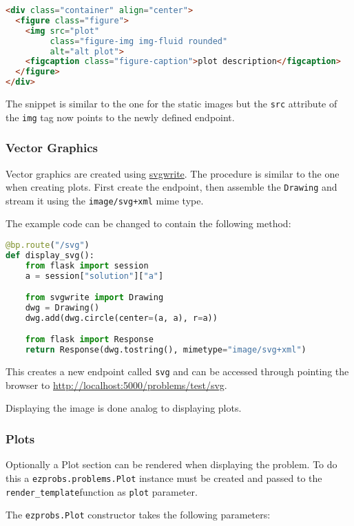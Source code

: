 \begin{lstlisting}[language=html]
<div class="container" align="center">
  <figure class="figure">
    <img src="plot"
         class="figure-img img-fluid rounded"
         alt="alt plot">
    <figcaption class="figure-caption">plot description</figcaption>
  </figure>
</div>
\end{lstlisting}

The snippet is similar to the one for the static images but the \verb+src+
attribute of the \verb+img+ tag now points to the newly defined endpoint.

\subsubsection{Vector Graphics}

Vector graphics are created using
\href{https://github.com/mozman/svgwrite}{svgwrite}. The procedure is similar
to the one when creating plots. First create the endpoint, then assemble the
\verb+Drawing+ and stream it using the \verb|image/svg+xml| mime type.

The example code can be changed to contain the following method:

\begin{lstlisting}[language=python]
@bp.route("/svg")
def display_svg():
    from flask import session
    a = session["solution"]["a"]

    from svgwrite import Drawing
    dwg = Drawing()
    dwg.add(dwg.circle(center=(a, a), r=a))

    from flask import Response
    return Response(dwg.tostring(), mimetype="image/svg+xml")
\end{lstlisting}

This creates a new endpoint called \verb+svg+ and can be accessed through
pointing the browser to
\href{http://localhost:5000/problems/test/svg}{http://localhost:5000/problems/test/svg}.

Displaying the image is done analog to displaying plots.

\subsubsection{Plots}

Optionally a Plot section can be rendered when displaying the problem. To do
this a \verb+ezprobs.problems.Plot+ instance must be created and passed to the
\verb+render_template+function as \verb+plot+ parameter.

The \verb+ezprobs.Plot+ constructor takes the following parameters:

